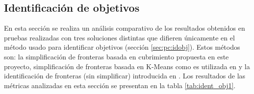 


\subsection{Identificación de objetivos}\label{sec:exp:idobj}
En esta sección se realiza un análisis comparativo de los resultados obtenidos
en pruebas realizadas con tres soluciones distintas que difieren únicamente en
el método usado para identificar objetivos (sección \ref{sec:pc:idobj}). Estos
métodos son: la simplificación de fronteras basada en cubrimiento propuesta en
este proyecto, simplificación de fronteras basada en K-Means como es utilizada en
\cite{Amorin2019} y la identificación de fronteras (sin simplificar)
introducida en \cite{yamauchi1997frontier}. Los resultados de las métricas
analizadas en esta sección se presentan en la tabla \ref{tab:ident_obj1}.



